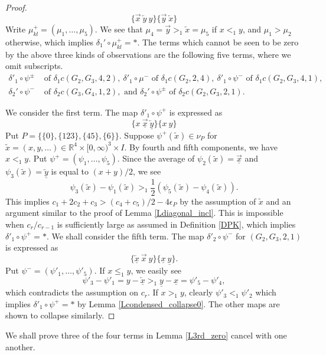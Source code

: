 \documentclass[reqno]{amsart}
\theoremstyle{definition}
\theoremstyle{plain}
\newcommand{\eps}{\epsilon}
\newcommand{\RR}{\mathbb{R}}
\begin{document}
\begin{proof}
\[
\{\overrightarrow{x}\   \overleftarrow{y}\ y\}\{\overrightarrow{y}\  \overleftarrow{x}\}
\]
Write $\mu^+_{kl}=(\mu_1,\dots,\mu_5)$. We see that $\mu_4=\overrightarrow{y}>_1\overleftarrow{x}=\mu_5$ if $x<_1y$, and $\mu_1>\mu_2$ otherwise, which implies $\delta_1'\circ\mu^+_{kl}=*$.
The terms which cannot be seen to be zero by the above three kinds of observations are the following five terms, where we omit subscripts.
\[
\begin{split}
\delta'_1\circ\psi^\pm&\text{ of }\delta_1c(G_2,G_3,4,2),
\ \delta'_1\circ\mu^-\text{ of }\delta_1 c(G_2,2,4),\ \delta'_1\circ\psi^-\text{ of }\delta_1 c(G_2,G_3,4,1),\\
\delta_2'\circ\psi^{-}& \text{ of } \delta_2c(G_3,G_4,1,2), \text{ and }\delta_2'\circ\psi^\pm \text{ of }\delta_2c(G_2,G_3,2,1).
\end{split}
\]

We consider the first term. The map $\delta'_1\circ\psi^+$ is expressed as 
\[
\{x\   \overrightarrow{\underline{x}}\ \overleftarrow{\underline{y}}\}\{x\  y\}
\]
Put $P=\{\{0\},\{123\},\{45\},\{6\}\}$. Suppose $\psi^+(\tilde x)\in \nu_P$ for $\tilde x=(x,y,\dots)\in \RR^4\times [0,\infty)^3\times I$. By fourth and fifth components, we have $x<_1y$. Put $\psi^+=(\psi_1,\dots,\psi_5)$. Since the average of $\psi_2(\tilde x)=\overrightarrow{\underline{x}}$ and $\psi_3(\tilde x)=\overleftarrow{\underline{y}}$ is equal to $(x+y)/2$, we see
\[
\psi_3(\tilde x)-\psi_1(\tilde x)>_1\frac{1}{2}(\psi_5(\tilde x)-\psi_4(\tilde x)).
\]
This implies
$
c_1+2c_2+c_3>(c_4+c_5)/2-4\eps_P
$
by the assumption of $\tilde x$ and an argument similar to the proof of Lemma \ref{Ldiagonal_incl}.
This is impossible when $c_r/c_{r-1}$ is sufficiently large as assumed in Definition \ref{DPK}, which implies $\delta'_1\circ \psi^+=*$. We shall consider the fifth term. The map $\delta'_2\circ\psi^-$ for $(G_2,G_3,2,1)$ is expressed as 
\[
\{ \overleftarrow{\underline{x}}\  \overrightarrow{x}\ y\}\{\underline{x}\ \underline{y}\}.
\]
Put $\psi^-=(\psi'_1,\dots, \psi'_5)$. If $x\leq_1y$, we easily see 
\[
\psi'_3-\psi'_1=y-\overleftarrow{\underline{x}}>_1\underline{y}-\underline{x}=\psi'_5-\psi'_4,
\] which contradicts the assumption on $c_r$. If $x>_1y$, clearly $\psi'_3<_1\psi'_2$ which implies $\delta'_1\circ \psi^+=*$ by Lemma \ref{Lcondensed_collapse0}. The other maps are shown to collapse similarly.\end{proof}
We shall prove three of the four terms in Lemma \ref{L3rd_zero} cancel with one another.
\end{document}
